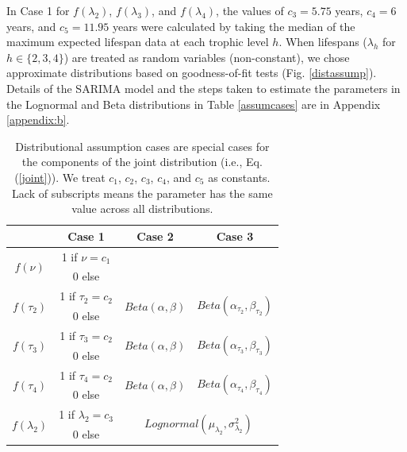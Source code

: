 \documentclass[oneside,12pt,final]{sty/ucthesis-CA2012}
\let\cite\citep                             %
\begin{document}
\begin{mainmatter}
\vspace{5mm}

In Case 1 for $f(\lambda_2)$, $f(\lambda_3)$, and $f(\lambda_4)$, the values of $c_3=5.75$ years, $c_4=6$ years, and $c_5=11.95$ years were calculated by taking the median of the maximum expected lifespan data at each trophic level $h$. When lifespans ($\lambda_h$ for $h \in \{2, 3, 4\}$) are treated as random variables (non-constant), we chose approximate distributions based on goodness-of-fit tests \cite{fitdistrplus} (Fig. \ref{distassump}). Details of the SARIMA model and the steps taken to estimate the parameters in the Lognormal and Beta distributions in Table \ref{assumcases} are in Appendix \ref{appendix:b}.
   
\begin{table}[H]
\centering
\caption{Distributional assumption cases are special cases for the components of the joint distribution (i.e., Eq. (\ref{joint})). We treat $c_1$, $c_2$, $c_3$, $c_4$, and $c_5$ as constants.  Lack of subscripts means the parameter has the same value across all distributions.}
\begin{tabular}{|c|c|c|c|}
  \hline 
 	& Case 1 & Case 2 & Case 3  \\ 
   \hline
   \multirow{2}{*}{$f(\nu)$} 	& 1 if $\nu = c_1$ & 
   \multicolumn{2}{c|}{ \multirow{2}{*}{$Lognormal(\mu_\nu, \sigma_\nu^2)$ }} \\
   				& 0 else 			 & 	\multicolumn{2}{c|}{ } \\
   \hline   
   \multirow{2}{*}{$f(\tau_2)$} & 1 if $\tau_2 = c_2$ & \multirow{2}{*}{$Beta(\alpha, \beta)$} & \multirow{2}{*}{$Beta(\alpha_{\tau_2}, \beta_{\tau_2})$}  \\
         			& 0 else &  &  \\
   \hline   
   \multirow{2}{*}{$f(\tau_3)$}  & 1 if $\tau_3 = c_2$ & \multirow{2}{*}{$Beta(\alpha, \beta)$} & \multirow{2}{*}{$Beta(\alpha_{\tau_3}, \beta_{\tau_3})$}  \\
            			& 0 else & &  \\
   \hline  
   \multirow{2}{*}{$f(\tau_4)$} & 1 if $\tau_4 = c_2$ &  \multirow{2}{*}{$Beta(\alpha, \beta)$} & \multirow{2}{*}{$Beta(\alpha_{\tau_4}, \beta_{\tau_4})$}  \\
               			& 0 else & &  \\
   \hline      	
    \multirow{2}{*}{$f(\lambda_2)$} & 1 if $\lambda_2 = c_3$ & \multicolumn{2}{c|}{\multirow{2}{*}{$Lognormal(\mu_{\lambda_2}, \sigma_{\lambda_2}^2)$}} \\
    	& 0 else	& 	\multicolumn{2}{c|}{ }  \\

\end{tabular}
\end{table}
\end{mainmatter}
\end{document}
